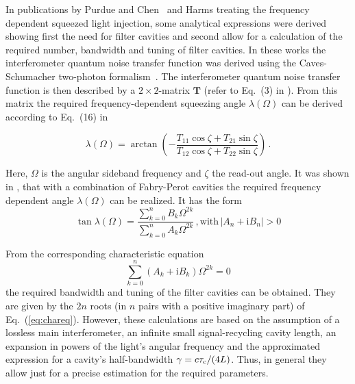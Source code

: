 In publications by Purdue and Chen~\cite{Purdue2002a} and Harms \cite{OpticalSpringHarms2003} treating the frequency dependent squeezed light injection, some analytical expressions were derived showing first the need for filter cavities and second allow for a calculation of the required number,  bandwidth and tuning of filter cavities.
In these works the interferometer quantum noise transfer function was derived using the Caves-Schumacher two-photon formalism~\cite{Caves1985}. The interferometer quantum noise transfer function is then described by a $2\times 2$-matrix $\mathbf{T}$ (refer to Eq.~(3) in \cite{OpticalSpringHarms2003}).  From this matrix the required frequency-dependent squeezing angle $\lambda(\Omega)$ can be derived according to Eq.~(16) in \cite{OpticalSpringHarms2003}

\begin{equation}
\lambda(\Omega) = \arctan\left(-\frac{T_{11}\cos\zeta + T_{21}\sin\zeta}{T_{12}\cos\zeta + T_{22}\sin\zeta}\right)\,.\label{eq:lopt}
\end{equation}

Here, $\Omega$ is the angular sideband frequency and $\zeta$ the read-out angle. It was shown in \cite{Purdue2002a}, that with a combination of Fabry-Perot cavities the required frequency dependent angle $\lambda(\Omega)$ can be realized. It  has the form \cite{Purdue2002a}
\begin{equation}
\tan\lambda(\Omega) = \frac{\sum_{k=0}^{n} B_k\Omega^{2k}}{ \sum_{k=0}^{n} A_k\Omega^{2k}}\,, \text{with}\, \left|A_n+\mathrm{i}B_n\right|>0
\end{equation}

From the corresponding characteristic equation
\begin{equation}
\sum_{k=0}^{n} \left(A_k+\mathrm{i}B_k\right)\Omega^{2k}=0\label{eq:chareq}
\end{equation}
the required bandwidth and tuning of the filter cavities can be obtained. They are given by the $2n$ roots (in $n$ pairs with a positive imaginary part) of Eq.~(\ref{eq:chareq}).
However, these calculations are based on the assumption of a lossless main interferometer, an infinite small signal-recycling cavity length,  an expansion in powers of the light's angular frequency and the approximated expression for a cavity's half-bandwidth $\gamma=c\tau_{\rm c}/(4L)$. Thus, in general they allow just for a precise estimation for the required parameters.

